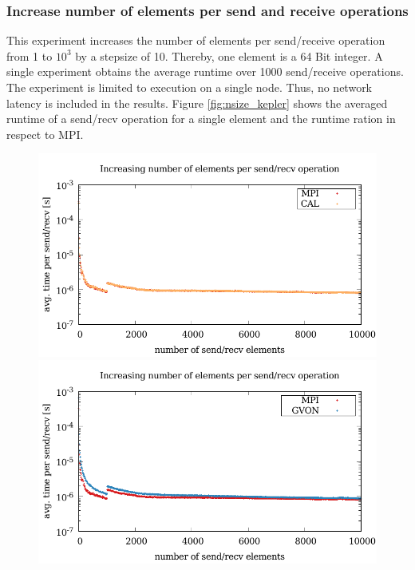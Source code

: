 \subsubsection*{Increase number of elements per send and receive operations}
This experiment increases the number of elements per send/receive
operation from 1 to $10^3$ by a stepsize of 10. Thereby, one element is
a 64 Bit integer. A single experiment obtains the average runtime over
1000 send/receive operations.  The experiment is limited to execution
on a single node. Thus, no network latency is included in the
results. Figure \ref{fig:nsize_kepler} shows the averaged runtime of a
send/recv operation for a single element and the runtime ration in
respect to MPI.

\begin{figure}[H]
  \begin{minipage}[t]{0.5\textwidth}
    \includegraphics[width=\textwidth]{plots/50_nsize_cal_kepler}
    \includegraphics[width=\textwidth]{plots/50_nsize_gvon_kepler}

\end{minipage}
\end{figure}
